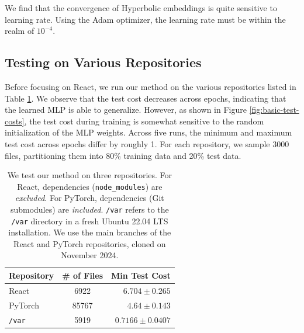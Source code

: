 \documentclass{article}
\begin{document}
We find that the convergence of Hyperbolic embeddings is quite sensitive to learning rate. Using the Adam optimizer, the learning rate must be within the realm of $10^{-4}$.

\subsection{Testing on Various Repositories}

Before focusing on React, we run our method on the various repositories listed in Table \ref{tab:repositories}. We observe that the test cost decreases across epochs, indicating that the learned MLP is able to generalize. However, as shown in Figure \ref{fig:basic-test-costs}, the test cost during training is somewhat sensitive to the random initialization of the MLP weights. Across five runs, the minimum and maximum test cost across epochs differ by roughly 1. For each repository, we sample 3000 files, partitioning them into 80\% training data and 20\% test data.

\begin{table}[H]
  \centering
  \begin{tabular}{lcr}
    \toprule
    \textbf{Repository} & \textbf{\# of Files} & \textbf{Min Test Cost} \\
    \midrule
    React               & 6922                 & $6.704 \pm 0.265$      \\
    PyTorch             & 85767                & $4.64 \pm 0.143$       \\
    \texttt{/var}       & 5919                 & $0.7166 \pm 0.0407$    \\
    \bottomrule
  \end{tabular}
  \caption{We test our method on three repositories. For React, dependencies (\texttt{node\_modules}) are \emph{excluded}. For PyTorch, dependencies (Git submodules) are \emph{included}. \texttt{/var} refers to the \texttt{/var} directory in a fresh Ubuntu 22.04 LTS installation. We use the main branches of the React and PyTorch repositories, cloned on November 2024.}
  \label{tab:repositories}
\end{table}
\end{document}
